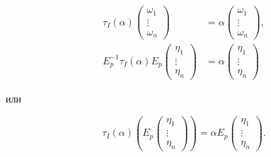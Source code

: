 \begin{equation} 


\begin{split} 


\tau_I(\alpha) 


\begin{pmatrix} 


\omega_1 \\ \vdots \\ \omega_n 


\end{pmatrix} 


&=\alpha 


\begin{pmatrix} 


\omega_1 \\ \vdots \\ \omega_n 


\end{pmatrix} 


, \\ 


E^{-1}_p\tau_I(\alpha)E_p 


\begin{pmatrix} 


\eta_1 \\ \vdots \\ \eta_n 


\end{pmatrix} 


&=\alpha 


\begin{pmatrix} 


\eta_1 \\ \vdots \\ \eta_n 


\end{pmatrix} 


\end{split} 


\end{equation} 


или 


\begin{equation} 


\tau_I(\alpha)\left(E_p 


\begin{pmatrix} 


\eta_1 \\ \vdots \\ \eta_n 


\end{pmatrix} 


\right)=\alpha E_p 


\begin{pmatrix} 


\eta_1 \\ \vdots \\ \eta_n 


\end{pmatrix} 


. 


\end{equation} 


